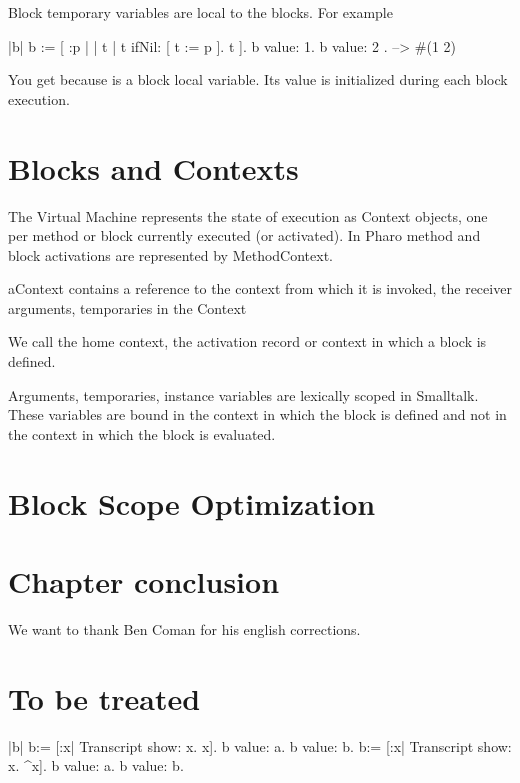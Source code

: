 \documentclass[a4paper,10pt,twoside]{book}
\begin{document}
Block temporary variables are local to the blocks. For example


\begin{code}{}
|b|
b := [ :p |
	| t |
	t ifNil: [ t := p ].
	t ].
{ b value: 1. b value: 2 }.
   -->  #(1 2)
\end{code}

You get  because  is a block local variable. Its value is initialized during each block execution.




\section{Blocks and Contexts}


The Virtual Machine represents the state of execution as Context objects, one per method or block currently executed (or activated). In Pharo method and block activations are represented by MethodContext.

aContext contains a reference to the context from which it is invoked, the receiver arguments, temporaries in the Context

We call the home context, the activation record or context in which a block is defined.

Arguments, temporaries, instance variables are lexically scoped in Smalltalk. These variables are bound in the context in which the block is defined and not in the context in which the block is evaluated.




\section{Block Scope Optimization}







\section{Chapter conclusion}


We want to thank Ben Coman for his english corrections.

\section{To be treated}

\begin{code}{}
|b| 
b:= [:x| Transcript show: x. x].
b value: a. b value: b.
b:= [:x| Transcript show: x. ^x].
b value: a. b value: b.
\end{code}
 
\end{document}
